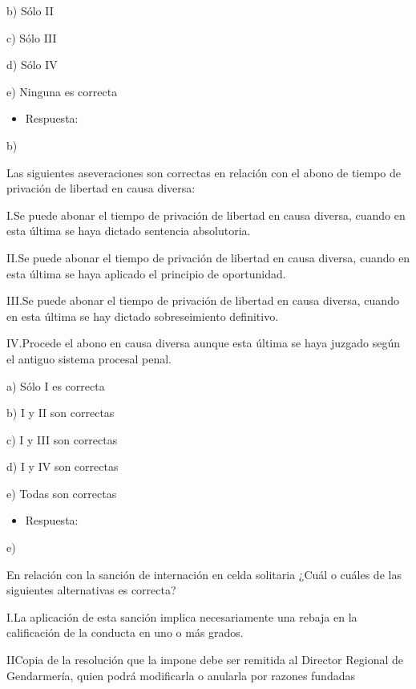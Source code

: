 \documentclass[letterpaper, 11pt]{article}
\begin{document}
b) Sólo II

c) Sólo III

d) Sólo IV

e) Ninguna es correcta


\begin{itemize}
\item Respuesta:
\end{itemize}

b)


Las siguientes aseveraciones son correctas en relación con el abono de
tiempo de privación de libertad en causa diversa:


I.Se puede abonar el tiempo de privación de libertad en causa diversa,
cuando en esta última se haya dictado sentencia absolutoria.



II.Se puede abonar el tiempo de privación de libertad en causa
diversa, cuando en esta última se haya aplicado el principio de
oportunidad.



III.Se puede abonar el tiempo de privación de libertad en causa
diversa, cuando en esta última se hay dictado sobreseimiento
definitivo.



IV.Procede el abono en causa diversa aunque esta última se haya
juzgado según el antiguo sistema procesal penal.



a) Sólo I es correcta

b) I y II son correctas

c) I y III son correctas

d) I y IV son correctas

e) Todas son correctas


\begin{itemize}
\item Respuesta:
\end{itemize}

e)


En relación con la sanción de internación en celda solitaria ¿Cuál o
cuáles de las siguientes alternativas es correcta?

I.La aplicación de esta sanción implica necesariamente una rebaja en
la calificación de la conducta en uno o más grados.



IICopia de la resolución que la impone debe ser remitida al Director
Regional de Gendarmería, quien podrá modificarla o anularla por
razones fundadas
\end{document}
